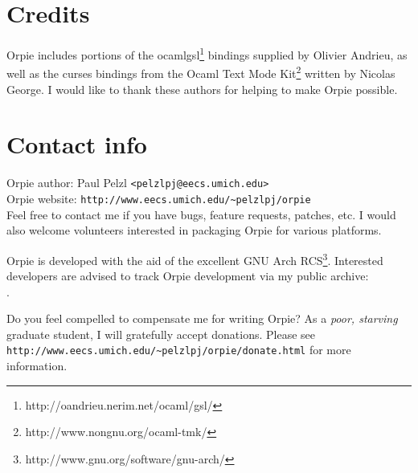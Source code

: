 \documentclass[11pt,notitlepage]{article}
\begin{document}
\section{Credits}
Orpie includes portions of the
ocamlgsl\footnote{http://oandrieu.nerim.net/ocaml/gsl/} bindings supplied by
Olivier Andrieu, as well as the curses bindings from the Ocaml Text Mode
Kit\footnote{http://www.nongnu.org/ocaml-tmk/} written by Nicolas George.  I
would like to thank these authors for helping to make Orpie possible.


\section{Contact info}
Orpie author: Paul Pelzl {\tt <pelzlpj@eecs.umich.edu>} \\
Orpie website: {\tt http://www.eecs.umich.edu/\~{}pelzlpj/orpie} \\


\noindent
Feel free to contact me if you have bugs, feature requests, patches, etc.  I 
would also welcome volunteers interested in packaging Orpie for various platforms.

Orpie is developed with the aid of the excellent GNU Arch
RCS\footnote{http://www.gnu.org/software/gnu-arch/}.  Interested 
developers are advised to track Orpie development via my public archive: \\
 .  

Do you feel compelled to compensate me for writing Orpie?  As a {\em poor, 
starving} graduate student, I will gratefully accept donations.  Please see \\
{\tt http://www.eecs.umich.edu/\~{}pelzlpj/orpie/donate.html} for more information.
\end{document}
